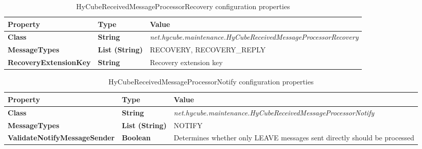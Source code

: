 \begin{table}
\scriptsize
\begin{center}
\begin{tabular}{p{4.5cm} p{1.5cm} p{8.5cm}}
	\hline
	\textbf{Property}							& \textbf{Type}					& \textbf{Value}					\\[1mm]
    \hline
	\textbf{Class}								& \textbf{String}				& \textit{net.hycube.maintenance.HyCubeReceivedMessageProcessorRecovery}								\\[1.5mm]	
	\textbf{MessageTypes}						& \textbf{List (String)}		& RECOVERY, RECOVERY\_REPLY																				\\[1.5mm]	
	\textbf{RecoveryExtensionKey}				& \textbf{String}				& Recovery extension key																				\\[1.5mm]	
    \hline
\end{tabular}
\end{center}
\caption{HyCubeReceivedMessageProcessorRecovery configuration properties}
\label{tab:libHyCubeReceivedMessageProcessorRecovery}
\end{table}


\begin{table}
\scriptsize
\begin{center}
\begin{tabular}{p{4.0cm} p{1.5cm} p{9.0cm}}
	\hline
	\textbf{Property}							& \textbf{Type}					& \textbf{Value}					\\[1mm]
    \hline
	\textbf{Class}								& \textbf{String}				& \textit{net.hycube.maintenance.HyCubeReceivedMessageProcessorNotify}				\\[1.5mm]	
	\textbf{MessageTypes}						& \textbf{List (String)}		& NOTIFY																			\\[1.5mm]	
	\textbf{ValidateNotifyMessageSender}		& \textbf{Boolean}				& Determines whether only LEAVE messages sent directly should be processed			\\[1.5mm]	
    \hline
\end{tabular}
\end{center}
\caption{HyCubeReceivedMessageProcessorNotify configuration properties}
\label{tab:libHyCubeReceivedMessageProcessorNotify}
\end{table}


